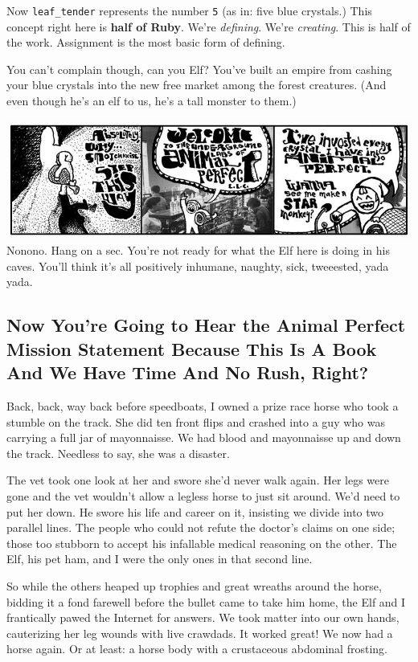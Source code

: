 \documentclass[10pt,twoside]{report}
\begin{document}
Now \lstinline[breaklines=true]|leaf_tender| represents the number
\lstinline[breaklines=true]|5| (as in: five blue crystals.)  This
concept right here is {\bf half of Ruby}.  We're {\em defining}.
We're {\em creating}.  This is half of the work.  Assignment is the
most basic form of defining.

You can't complain though, can you Elf?  You've built an empire from
cashing your blue crystals into the new free market among the forest
creatures.  (And even though he's an elf to us, he's a tall monster to
them.)

	\includegraphics[width=1.0\textwidth]{cache/23.png} Nonono.
        Hang on a sec.  You're not ready for what the Elf here is
        doing in his caves. You'll think it's all positively inhumane,
        naughty, sick, tweeested, yada yada.



\subsection{ Now You're Going to Hear the Animal Perfect Mission
  Statement Because This Is A Book And We Have Time And No Rush,
  Right?}



Back, back, way back before speedboats, I owned a prize race horse who
took a stumble on the track.  She did ten front flips and crashed into
a guy who was carrying a full jar of mayonnaisse.  We had blood and
mayonnaisse up and down the track.  Needless to say, she was a
disaster.

The vet took one look at her and swore she'd never walk again.  Her
legs were gone and the vet wouldn't allow a legless horse to just sit
around.  We'd need to put her down.  He swore his life and career on
it, insisting we divide into two parallel lines.  The people who could
not refute the doctor's claims on one side; those too stubborn to
accept his infallable medical reasoning on the other.  The Elf, his
pet ham, and I were the only ones in that second line.

So while the others heaped up trophies and great wreaths around the
horse, bidding it a fond farewell before the bullet came to take him
home, the Elf and I frantically pawed the Internet for answers.  We
took matter into our own hands, cauterizing her leg wounds with live
crawdads.  It worked great!  We now had a horse again.  Or at least: a
horse body with a crustaceous abdominal frosting.
\end{document}
